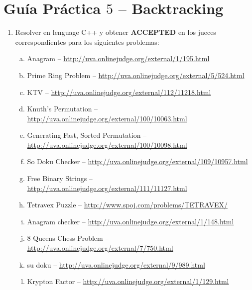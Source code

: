 




\section*{Gu\'ia Pr\'actica $5$ -- Backtracking}

\begin{enumerate}[1 -]
	
	\item Resolver en lenguage C++ y obtener \textbf{ACCEPTED} en los jueces correspondientes para los siguientes problemas:
	
	\begin{enumerate}[a)]
		\item Anagram -- \href{http://uva.onlinejudge.org/external/1/195.html}{http://uva.onlinejudge.org/external/1/195.html}
		\item Prime Ring Problem -- \href{http://uva.onlinejudge.org/external/5/524.html}{http://uva.onlinejudge.org/external/5/524.html}
		\item KTV -- \href{http://uva.onlinejudge.org/external/112/11218.html}{http://uva.onlinejudge.org/external/112/11218.html}
		\item Knuth’s Permutation -- \href{http://uva.onlinejudge.org/external/100/10063.html}{http://uva.onlinejudge.org/external/100/10063.html}
		\item Generating Fast, Sorted Permutation -- \href{http://uva.onlinejudge.org/external/100/10098.html}{http://uva.onlinejudge.org/external/100/10098.html}
		\item So Doku Checker -- \href{http://uva.onlinejudge.org/external/109/10957.html}{http://uva.onlinejudge.org/external/109/10957.html}
		\item Free Binary Strings -- \href{http://uva.onlinejudge.org/external/111/11127.html}{http://uva.onlinejudge.org/external/111/11127.html}
		\item Tetravex Puzzle -- \href{http://www.spoj.com/problems/TETRAVEX/}{http://www.spoj.com/problems/TETRAVEX/}
		\item Anagram checker -- \href{http://uva.onlinejudge.org/external/1/148.html}{http://uva.onlinejudge.org/external/1/148.html}
		\item 8 Queens Chess Problem  -- \href{http://uva.onlinejudge.org/external/7/750.html}{http://uva.onlinejudge.org/external/7/750.html}

		\item su doku -- \href{http://uva.onlinejudge.org/external/9/989.html}{http://uva.onlinejudge.org/external/9/989.html}
		\item Krypton Factor -- \href{http://uva.onlinejudge.org/external/1/129.html}{http://uva.onlinejudge.org/external/1/129.html}
	\end{enumerate}

\end{enumerate}






